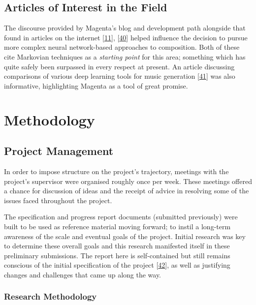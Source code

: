 \documentclass[12pt,]{article}
\begin{document}
\hypertarget{articles-of-interest-in-the-field}{%
\subsection{Articles of Interest in the
Field}\label{articles-of-interest-in-the-field}}

The discourse provided by Magenta's blog and development path alongside
that found in articles on the internet
{[}\protect\hyperlink{ref-mediumkylemcdonald}{11}{]},
{[}\protect\hyperlink{ref-mkofler}{40}{]} helped influence the decision
to pursue more complex neural network-based approaches to composition.
Both of these cite Markovian techniques as a \emph{starting point} for
this area; something which has quite safely been surpassed in every
respect at present. An article discussing comparisons of various deep
learning tools for music generation
{[}\protect\hyperlink{ref-asimovinst}{41}{]} was also informative,
highlighting Magenta as a tool of great promise.

\hypertarget{methodology}{%
\section{Methodology}\label{methodology}}

\hypertarget{project-management}{%
\subsection{Project Management}\label{project-management}}

In order to impose structure on the project's trajectory, meetings with
the project's supervisor were organised roughly once per week. These
meetings offered a chance for discussion of ideas and the receipt of
advice in resolving some of the issues faced throughout the project.

The specification and progress report documents (submitted previously)
were built to be used as reference material moving forward; to instil a
long-term awareness of the scale and eventual goals of the project.
Initial research was key to determine these overall goals and this
research manifested itself in these preliminary submissions. The report
here is self-contained but still remains conscious of the initial
specification of the project
{[}\protect\hyperlink{ref-specification}{42}{]}, as well as justifying
changes and challenges that came up along the way.

\hypertarget{research-methodology}{%
\subsubsection{Research Methodology}\label{research-methodology}}
\end{document}
